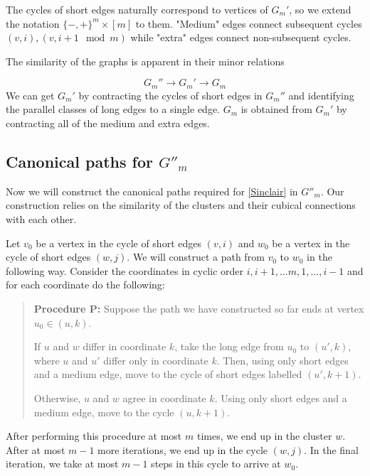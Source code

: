 The cycles of short edges naturally correspond to vertices of $G_m'$, so we extend the notation $\{-,+\}^m \times [m]$ to them. "Medium" edges connect subsequent cycles $(v,i), (v,i+1 \mod m)$ while "extra" edges connect non-subsequent cycles. 

The similarity of the graphs is apparent in their minor relations

\begin {equation}
G_m'' \rightarrow G_m' \rightarrow G_m
\end{equation}
We can get $G_m'$ by contracting the cycles of short edges in $G_m''$ and identifying the parallel classes of long edges 
to a single edge. $G_m$ is obtained from $G_m'$ by contracting all of the medium and extra edges.

\subsection{Canonical paths for $G''_m$}
\label{canpaths}

Now we will construct the canonical paths required for \ref{Sinclair} in $G''_m$. Our construction relies on the similarity
of the clusters and their cubical connections with each other.

Let $v_0$ be a vertex in the cycle of short edges $(v,i)$ and $w_0$ be a vertex in the cycle of short edges $(w,j)$. 
We will construct a path from $v_0$ to $w_0$ in the following way. Consider the coordinates in cyclic order $i, i+1, \dots m, 1, \dots,
i-1$ and for each coordinate do the following:

\begin{quote}
\textbf{Procedure P:}
Suppose the path we have constructed so far ends at vertex $u_0 \in (u,k)$.
\begin{compactitem}
\item If $u$ and $w$ differ in coordinate $k$, take the long edge from $u_0$ to $(u',k)$,
where $u$ and $u'$ differ only in coordinate $k$. Then, using only short edges and a medium edge,
move to the cycle of short edges labelled $(u', k+1)$.
\item Otherwise, $u$ and $w$ agree in coordinate $k$. Using only short edges and a medium edge,
move to the cycle $(u, k+1)$.
\end{compactitem}
\end{quote}

After performing this procedure at most $m$ times, we end up in the cluster $w$. After at most $m-1$ more
iterations, we end up in the cycle $(w,j)$. In the final iteration, we take at most $m-1$ steps in this cycle to arrive
at $w_0$.

